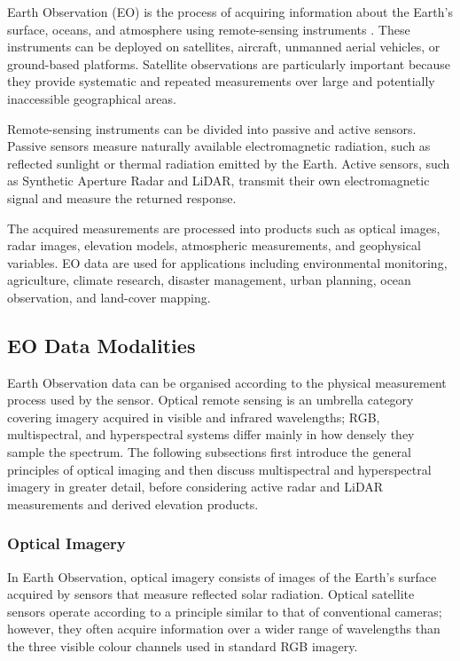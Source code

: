\documentclass[11pt,a4paper]{article}
\begin{document}
Earth Observation (EO) is the process of acquiring information about
the Earth's surface, oceans, and atmosphere using remote-sensing
instruments \cite{esa_earth_observation}. These instruments can be
deployed on satellites, aircraft, unmanned aerial vehicles, or
ground-based platforms. Satellite observations are particularly
important because they provide systematic and repeated measurements
over large and potentially inaccessible geographical areas.

Remote-sensing instruments can be divided into passive and active
sensors. Passive sensors measure naturally available electromagnetic
radiation, such as reflected sunlight or thermal radiation emitted by
the Earth. Active sensors, such as Synthetic Aperture Radar and LiDAR,
transmit their own electromagnetic signal and measure the returned
response.

The acquired measurements are processed into products such as optical
images, radar images, elevation models, atmospheric measurements, and
geophysical variables. EO data are used for applications including
environmental monitoring, agriculture, climate research, disaster
management, urban planning, ocean observation, and land-cover mapping.

\subsection{EO Data Modalities}

Earth Observation data can be organised according to the physical
measurement process used by the sensor. Optical remote sensing is an
umbrella category covering imagery acquired in visible and infrared
wavelengths; RGB, multispectral, and hyperspectral systems differ mainly
in how densely they sample the spectrum. The following subsections first
introduce the general principles of optical imaging and then discuss
multispectral and hyperspectral imagery in greater detail, before
considering active radar and LiDAR measurements and derived elevation
products.

\subsubsection{Optical Imagery}

In Earth Observation, optical imagery consists of images of the Earth's
surface acquired by sensors that measure reflected solar radiation.
Optical satellite sensors operate according to a principle similar to
that of conventional cameras; however, they often acquire information
over a wider range of wavelengths than the three visible colour channels
used in standard RGB imagery.
\end{document}

